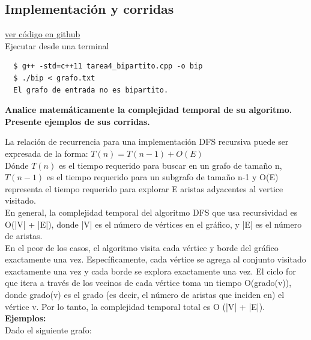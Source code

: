 \documentclass{article}
\begin{document}
\subsection{Implementación y corridas}

\href{https://github.com/luisballado/ADA/blob/main/practice_code/tarea4_bipartito.cpp}{ver código en github}\\

Ejecutar desde una terminal

\begin{commandline}
\begin{verbatim}
  $ g++ -std=c++11 tarea4_bipartito.cpp -o bip
  $ ./bip < grafo.txt
  El grafo de entrada no es bipartito.
\end{verbatim}
\end{commandline}

\newpage
\begin{question}
  \textbf{Analice matemáticamente la complejidad temporal de su algoritmo. Presente ejemplos de sus corridas.}
\end{question}
La relación de recurrencia para una implementación DFS recursiva puede ser expresada de la forma: $T(n)=T(n-1)+O(E)$ \\
Dónde $T(n)$ es el tiempo requerido para buscar en un grafo de tamaño n, $T(n-1)$ es el tiempo requerido para un subgrafo de tamaño n-1 y O(E) representa el tiempo requerido para explorar E aristas adyacentes al vertice visitado.\\

En general, la complejidad temporal del algoritmo DFS que usa recursividad es O(|V| + |E|), donde |V| es el número de vértices en el gráfico, y |E| es el número de aristas.\\

En el peor de los casos, el algoritmo visita cada vértice y borde del gráfico exactamente una vez. Específicamente, cada vértice se agrega al conjunto visitado exactamente una vez y cada borde se explora exactamente una vez. El ciclo for que itera a través de los vecinos de cada vértice toma un tiempo O(grado(v)), donde grado(v) es el grado (es decir, el número de aristas que inciden en) el vértice v. Por lo tanto, la complejidad temporal total es O (|V| + |E|).\\


\textbf{Ejemplos:}\\

Dado el siguiente grafo:
\end{document}
